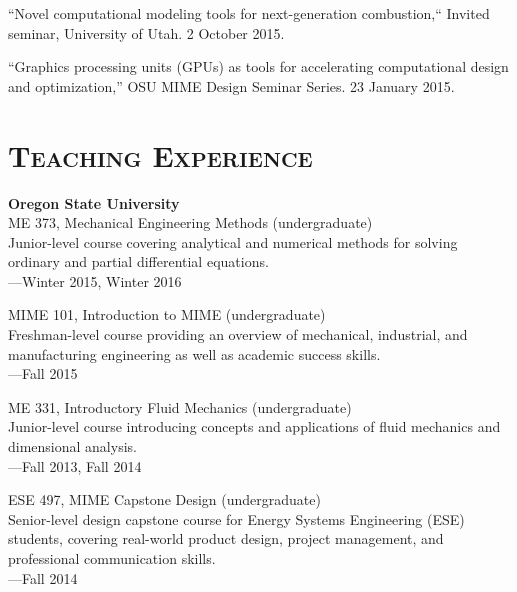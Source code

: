 \documentclass[margin,line,11pt]{res}
\makeatletter
\newlength{\bibhang}
\newlength{\bibsep}
 {\@listi \global\bibsep\itemsep \global\advance\bibsep by\parsep}
\newenvironment{bibenum*}
  {\renewcommand\labelenumi{\theenumi.}%
   \etaremune[
     topsep=0pt,
     itemsep=\bibsep,
     parsep=0pt,partopsep=0pt,
     itemindent=-\bibhang,
     leftmargin={\bibhang+\widthof{[999]}}]}
  {\endetaremune}
\newcommand*{\doi}[1]{\href{http://dx.doi.org/#1}{\nolinkurl{doi:#1}}}
\makeatother
\begin{document}
\begin{resume}
\begin{bibenum*}
\item ``Novel computational modeling tools for next-generation combustion,`` Invited seminar, University of Utah. 2 October 2015.

\item ``Graphics processing units (GPUs) as tools for accelerating computational design and optimization,'' OSU MIME Design Seminar Series. 23 January 2015.

\end{bibenum*}

%
%
%

\section{\textsc{Teaching Experience}}

\textbf{Oregon State University} \\
ME 373, Mechanical Engineering Methods (undergraduate) \\
Junior-level course covering analytical and numerical methods for solving ordinary and partial differential equations. \\
---Winter 2015, Winter 2016

MIME 101, Introduction to MIME (undergraduate) \\
Freshman-level course providing an overview of mechanical, industrial, and manufacturing engineering as well as academic success skills. \\
---Fall 2015

ME 331, Introductory Fluid Mechanics (undergraduate) \\
Junior-level course introducing concepts and applications of fluid mechanics and dimensional analysis. \\
---Fall 2013, Fall 2014

ESE 497, MIME Capstone Design (undergraduate) \\
Senior-level design capstone course for Energy Systems Engineering (ESE) students, covering real-world product design, project management, and professional communication skills. \\
---Fall 2014


\end{resume}
\end{document}
